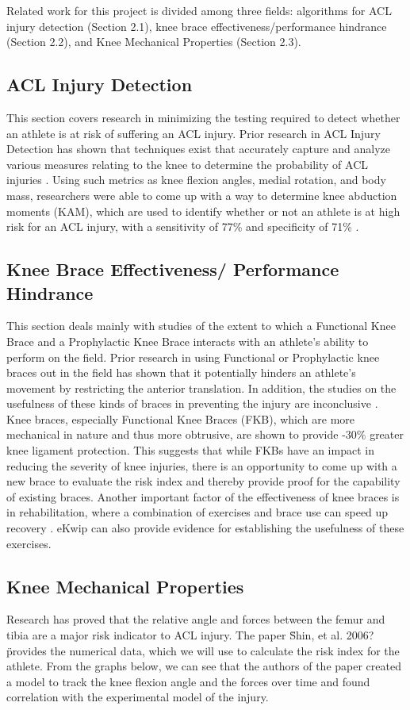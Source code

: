 Related work for this project is divided among three fields: algorithms for ACL injury detection (Section 2.1), knee brace effectiveness/performance hindrance (Section 2.2), and Knee Mechanical Properties (Section 2.3).

\subsection{ACL Injury Detection} This section covers research in minimizing the testing required to detect whether an athlete is at risk of suffering an ACL injury. Prior research in ACL Injury Detection has shown that techniques exist that accurately capture and analyze various measures relating to the knee to determine the probability of ACL injuries \cite{smedicine}. Using such metrics as knee flexion angles, medial rotation, and body mass, researchers were able to come up with a way to determine knee abduction moments (KAM), which are used to identify whether or not an athlete is at high risk for an ACL injury, with a sensitivity of 77\% and specificity of 71\% \cite{smedicine}\cite{Bahr01062005}. 

\subsection{Knee Brace Effectiveness/ Performance Hindrance} This section deals mainly with studies of the extent to which a Functional Knee Brace and a Prophylactic Knee Brace interacts with an athlete's ability to perform on the field. Prior research in using Functional or Prophylactic knee braces out in the field has shown that it potentially hinders an athlete's movement by restricting the anterior translation. In addition, the studies on the usefulness of these kinds of braces in preventing the injury are inconclusive \cite{Myer01042011}. Knee braces, especially Functional Knee Braces (FKB), which are more mechanical in nature and thus more obtrusive, are shown to provide -30\% greater knee ligament protection\”. This suggests that while FKBs have an impact in reducing the severity of knee injuries, there is an opportunity to come up with a new brace to evaluate the risk index and thereby provide proof for the capability of existing braces. Another important factor of the effectiveness of knee braces is in rehabilitation, where a combination of exercises and brace use can speed up recovery \cite{hewett2010acl}. eKwip can also provide evidence for establishing the usefulness of these exercises.

\subsection{Knee Mechanical Properties} Research has proved that the relative angle and forces between the femur and tibia are a major risk indicator to ACL injury. The paper \"Shin, et al. 2006?\" provides the numerical data, which we will use to calculate the risk index for the athlete. From the graphs below, we can see that the authors of the paper created a model to track the knee flexion angle and the forces over time and found correlation with the experimental model of the injury. 
